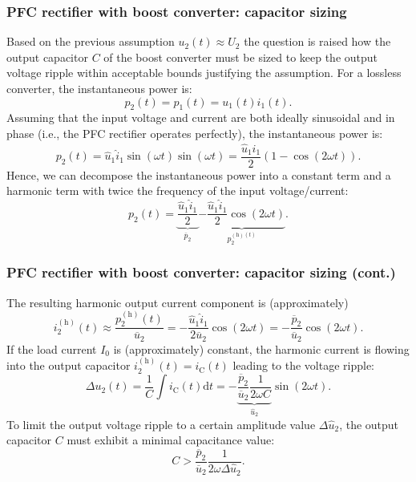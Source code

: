 \begin{frame}
    \frametitle{PFC rectifier with boost converter: capacitor sizing}
    Based on the previous assumption $u_2(t)\approx U_2$ the question is raised how the output capacitor $C$ of the boost converter must be sized to keep the output voltage ripple within acceptable bounds justifying the assumption. For a lossless converter, the instantaneous power is:
    \begin{equation*}
        p_2(t) =p_1(t) = u_1(t)i_1(t).
    \end{equation*}
    Assuming that the input voltage and  current are both ideally sinusoidal and in phase (i.e., the PFC rectifier operates perfectly), the instantaneous power is:
    \begin{equation}
        p_2(t) = \hat{u}_1\hat{i}_1\sin(\omega t)\sin(\omega t) = \frac{\hat{u}_1\hat{i}_1}{2}\left(1-\cos(2\omega t)\right).
    \end{equation}
    Hence, we can decompose the instantaneous power into a constant term and a harmonic term with twice the frequency of the input voltage/current:
    \begin{equation}
        p_2(t) = \underbrace{\frac{\hat{u}_1\hat{i}_1}{2}}_{\overline{p}_2} \underbrace{- \frac{\hat{u}_1\hat{i}_1}{2}\cos(2\omega t)}_{p_2^{(\mathrm{h})(t)}}.
    \end{equation}
\end{frame}

\begin{frame}
    \frametitle{PFC rectifier with boost converter: capacitor sizing (cont.)}
    The resulting harmonic output current component is (approximately)
    \begin{equation}
        i_2^{(\mathrm{h})}(t) \approx \frac{p_2^{(\mathrm{h})}(t)}{\overline{u}_2} = -\frac{\hat{u}_1\hat{i}_1}{2\overline{u}_2}\cos(2\omega t) = -\frac{\overline{p}_2}{\overline{u}_2}\cos(2\omega t).
    \end{equation}
    If the load current $I_0$ is (approximately) constant, the harmonic current is flowing into the output capacitor $i_2^{(\mathrm{h})}(t)=i_\mathrm{C}(t)$ leading to the voltage ripple:
    \begin{equation}
        \Delta u_2(t) = \frac{1}{C} \int  i_\mathrm{C}(t) \mathrm{d} t = -\underbrace{\frac{\overline{p}_2}{\overline{u}_2} \frac{1}{2\omega C}}_{\hat{u}_2} \sin(2\omega t).
    \end{equation}
    To limit the output voltage ripple to a certain amplitude value $\Delta \hat{u}_2$, the output capacitor $C$ must exhibit a minimal capacitance value:
    \begin{equation}
        C > \frac{\overline{p}_2}{\overline{u}_2} \frac{1}{2\omega \Delta \hat{u}_2}.
    \end{equation}
\end{frame}

